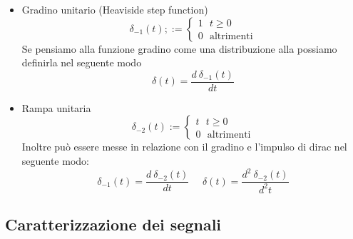 \documentclass{article}
\theoremstyle{definition}
\newtheorem*{proprieta}{Proprietà}
\begin{document}
\begin{itemize}
$$\begin{cases}
	0 
\end{cases}\right] $$
quindi può essere visualizzato come un segnale il cui punto di applicazione è l'origine , dove assume valore infinito  e la cui area complessiva è unitaria. In realtà l'impulso di Dirac è una distribuzione , quindi un concetto esteso di una funzione \\  Inoltre l'impulso di Dirac gode delle seguente proprietà
\begin{proprieta}
\begin{enumerate}
	\item $\delta(0)=+\infty$
	\item $\delta(t)=0 \ \forall t \neq 0$
	\item $\int_{-\infty}^{+\infty}\delta(t)=1 $ ( la sua area è uno )
	\item Proprietà di campionamento dell'impulso: \\
	Data una funzione v e un $t_0$ in cui la funziona sia continua vale : 
$$v(t_0)=\int_{-\infty}^{+\infty}v(\tau)\delta(\tau-t_0)d\tau=\int_{-\infty}^{+\infty}v(\tau)\delta(t_0-\tau)d\tau$$
\end{enumerate}
\end{proprieta}
\item Gradino unitario (Heaviside step function) 
$$\delta_{-1}(t);:=\begin{cases}
	1 \ \ \ t \geq 0 \\
	0 \ \ \ \text{altrimenti}
\end{cases}$$
Se pensiamo alla funzione gradino come una distribuzione alla possiamo definirla nel seguente modo 
$$\delta(t)=\frac{d\ \delta_{-1}(t)}{dt}$$
\item Rampa unitaria 
$$\delta_{-2}(t):=\begin{cases}
	t \ \ \ t \geq 0 \\
0 \ \ \ \text{altrimenti}
\end{cases}$$
Inoltre può essere messe in relazione con il gradino e l'impulso di dirac nel seguente modo:
$$\delta_{-1}(t)=\frac{d\ \delta_{-2}(t)}{dt} \ \ \ \ \ \   \delta(t)=\frac{d^2\ \delta_{-2}(t)}{d^2t}$$
\end{itemize}
\subsection{Caratterizzazione dei segnali} 
\end{document}
